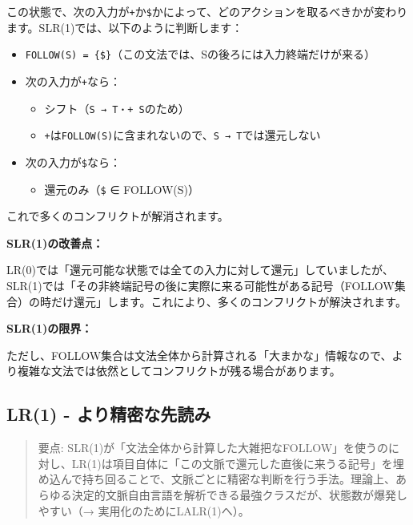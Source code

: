 この状態で、次の入力が\texttt{+}か\texttt{\$}かによって、どのアクションを取るべきかが変わります。SLR(1)では、以下のように判断します：

\begin{itemize}
\tightlist
\item
  \texttt{FOLLOW(S)\ =\ \{\$\}}（この文法では、Sの後ろには入力終端だけが来る）
\item
  次の入力が\texttt{+}なら：

  \begin{itemize}
  \tightlist
  \item
    シフト（\texttt{S\ →\ T・+\ S}のため）
  \item
    \texttt{+}は\texttt{FOLLOW(S)}に含まれないので、\texttt{S\ →\ T}では還元しない
  \end{itemize}
\item
  次の入力が\texttt{\$}なら：

  \begin{itemize}
  \tightlist
  \item
    還元のみ（\texttt{\$} ∈ FOLLOW(S)）
  \end{itemize}
\end{itemize}

これで多くのコンフリクトが解消されます。

\textbf{SLR(1)の改善点：}

LR(0)では「還元可能な状態では全ての入力に対して還元」していましたが、SLR(1)では「その非終端記号の後に実際に来る可能性がある記号（FOLLOW集合）の時だけ還元」します。これにより、多くのコンフリクトが解決されます。

\textbf{SLR(1)の限界：}

ただし、FOLLOW集合は文法全体から計算される「大まかな」情報なので、より複雑な文法では依然としてコンフリクトが残る場合があります。

\hypertarget{chapter5-lr1---ux3088ux308aux7cbeux5bc6ux306aux5148ux8aadux307f}{%
\subsection{LR(1) -
より精密な先読み}\label{chapter5-lr1---ux3088ux308aux7cbeux5bc6ux306aux5148ux8aadux307f}}

\begin{quote}
要点:
SLR(1)が「文法全体から計算した大雑把なFOLLOW」を使うのに対し、LR(1)は項目自体に「この文脈で還元した直後に来うる記号」を埋め込んで持ち回ることで、文脈ごとに精密な判断を行う手法。理論上、あらゆる決定的文脈自由言語を解析できる最強クラスだが、状態数が爆発しやすい（→
実用化のためにLALR(1)へ）。
\end{quote}

